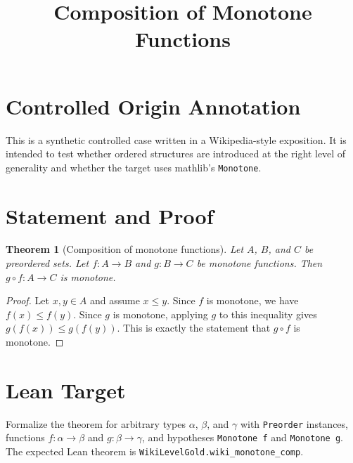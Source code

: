 \documentclass[11pt]{article}
\title{Composition of Monotone Functions}
\author{}
\date{}
\newtheorem{theorem}{Theorem}
\begin{document}
\maketitle

\section*{Controlled Origin Annotation}
This is a synthetic controlled case written in a Wikipedia-style exposition.
It is intended to test whether ordered structures are introduced at the right
level of generality and whether the target uses mathlib's \texttt{Monotone}.

\section*{Statement and Proof}

\begin{theorem}[Composition of monotone functions]
Let $A$, $B$, and $C$ be preordered sets. Let $f : A \to B$ and
$g : B \to C$ be monotone functions. Then $g \circ f : A \to C$ is monotone.
\end{theorem}

\begin{proof}
Let $x,y \in A$ and assume $x \le y$. Since $f$ is monotone, we have
$f(x) \le f(y)$. Since $g$ is monotone, applying $g$ to this inequality gives
$g(f(x)) \le g(f(y))$. This is exactly the statement that $g \circ f$ is
monotone.
\end{proof}

\section*{Lean Target}
Formalize the theorem for arbitrary types $\alpha$, $\beta$, and $\gamma$ with
\texttt{Preorder} instances, functions $f : \alpha \to \beta$ and
$g : \beta \to \gamma$, and hypotheses \texttt{Monotone f} and
\texttt{Monotone g}. The expected Lean theorem is
\texttt{WikiLevelGold.wiki\_monotone\_comp}.
\end{document}
